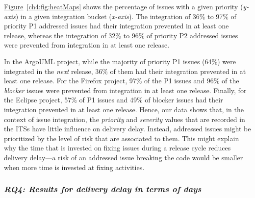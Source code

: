\hyperref[ch4:fig:heatMaps]{Figure}~\ref{ch4:fig:heatMaps} shows the percentage of
issues with a given priority (\textit{y-axis}) in a given integration bucket
(\textit{x-axis}). The integration of 36\% to 97\% of priority P1 addressed issues
had their integration prevented in at least one release, whereas the integration
of 32\% to 96\% of priority P2 addressed issues were prevented from integration in
at least one release. 

In the ArgoUML project, while the majority of priority P1 issues (64\%) were
integrated in the \textit{next} release, 36\% of them had their integration
prevented in at least one release. For the Firefox project, 97\% of the P1
issues and 96\% of the \textit{blocker} issues were prevented from integration
in at least one release. Finally, for the Eclipse project, 57\% of P1 issues and
49\% of blocker issues had their integration prevented in at least one release.
Hence, our data shows that, in the context of issue integration, the
\textit{priority} and \textit{severity} values that are recorded in the ITSs
have little influence on delivery delay. Instead, addressed issues might be
prioritized by the level of risk that are associated to
them. This might explain
why the time that is invested on fixing issues during a release cycle reduces
delivery delay---a risk of an addressed issue breaking the code would be
smaller when more time is invested at fixing activities. 


\subsubsection*{\textbf{\textit{RQ4: Results for delivery delay in terms of days}}}

